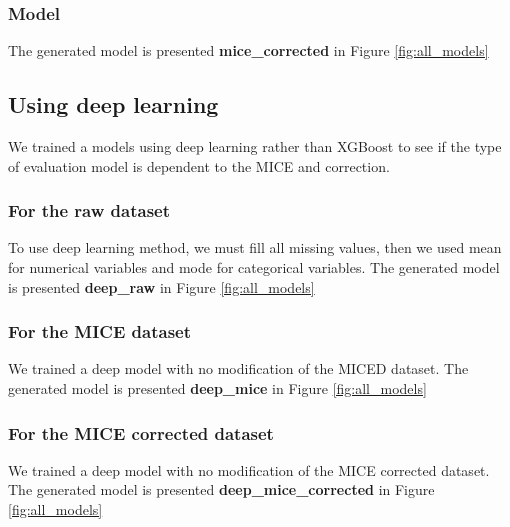 \documentclass{article}
\begin{document}
                \subsubsection{Model}
                The generated model is presented \textbf{mice\_corrected} in Figure \ref{fig:all_models}

        \subsection{Using deep learning}
            We trained a models using deep learning rather than XGBoost to see if the type of evaluation model is dependent to the MICE and correction.

            \subsubsection{For the raw dataset}
                To use deep learning method, we must fill all missing values, then we used mean for numerical variables and mode for categorical variables.
                The generated model is presented \textbf{deep\_raw} in Figure \ref{fig:all_models}

            \subsubsection{For the MICE dataset}
                We trained a deep model with no modification of the MICED dataset. The generated model is presented \textbf{deep\_mice} in Figure \ref{fig:all_models}

            \subsubsection{For the MICE corrected dataset}
                We trained a deep model with no modification of the MICE corrected dataset. 
                The generated model is presented \textbf{deep\_mice\_corrected} in Figure \ref{fig:all_models}
\end{document}
